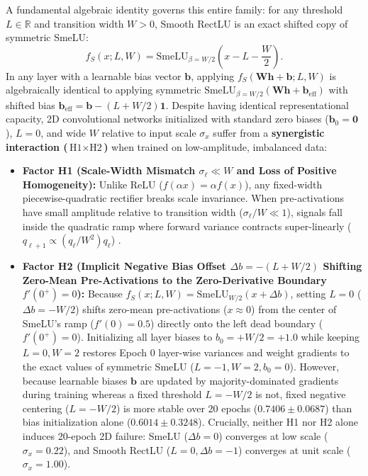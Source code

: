 \documentclass[11pt, a4paper]{article}
\begin{document}
A fundamental algebraic identity governs this entire family: for any threshold $L \in \mathbb{R}$ and transition width $W > 0$, Smooth RectLU is an exact shifted copy of symmetric SmeLU:
\begin{equation}
f_{S}(x; L, W) = \text{SmeLU}_{\beta = W/2}\!\left(x - L - \frac{W}{2}\right).
\end{equation}
In any layer with a learnable bias vector $\mathbf{b}$, applying $f_{S}(\mathbf{W}\mathbf{h} + \mathbf{b}; L, W)$ is algebraically identical to applying symmetric $\text{SmeLU}_{\beta=W/2}(\mathbf{W}\mathbf{h} + \mathbf{b}_{\text{eff}})$ with shifted bias $\mathbf{b}_{\text{eff}} = \mathbf{b} - (L + W/2)\mathbf{1}$. Despite having identical representational capacity, 2D convolutional networks initialized with standard zero biases ($\mathbf{b}_{0} = \mathbf{0}$), $L = 0$, and wide $W$ relative to input scale $\sigma_{x}$ suffer from a \textbf{synergistic interaction ($\text{H1} \times \text{H2}$)} when trained on low-amplitude, imbalanced data:
\begin{itemize}
    \item \textbf{Factor H1 (Scale-Width Mismatch $\sigma_{\ell} \ll W$ and Loss of Positive Homogeneity):} Unlike ReLU ($f(\alpha x) = \alpha f(x)$), any fixed-width piecewise-quadratic rectifier breaks scale invariance. When pre-activations have small amplitude relative to transition width ($\sigma_{\ell}/W \ll 1$), signals fall inside the quadratic ramp where forward variance contracts super-linearly ($q_{\ell+1} \propto (q_{\ell}/W^{2})q_{\ell}$) \cite{ref18, ref19, ref20}.
    \item \textbf{Factor H2 (Implicit Negative Bias Offset $\Delta b = -(L + W/2)$ Shifting Zero-Mean Pre-Activations to the Zero-Derivative Boundary $f'(0^{+}) = 0$):} Because $f_{S}(x; L, W) = \text{SmeLU}_{W/2}(x + \Delta b)$, setting $L = 0$ ($\Delta b = -W/2$) shifts zero-mean pre-activations ($x \approx 0$) from the center of SmeLU's ramp ($f'(0) = 0.5$) directly onto the left dead boundary ($f'(0^{+}) = 0$). Initializing all layer biases to $b_{0} = +W/2 = +1.0$ while keeping $L = 0, W = 2$ restores Epoch 0 layer-wise variances and weight gradients to the exact values of symmetric SmeLU ($L = -1, W = 2, b_{0} = 0$). However, because learnable biases $\mathbf{b}$ are updated by majority-dominated gradients during training whereas a fixed threshold $L = -W/2$ is not, fixed negative centering ($L = -W/2$) is more stable over 20 epochs ($0.7406 \pm 0.0687$) than bias initialization alone ($0.6014 \pm 0.3248$). Crucially, neither H1 nor H2 alone induces 20-epoch 2D failure: SmeLU ($\Delta b = 0$) converges at low scale ($\sigma_{x} = 0.22$), and Smooth RectLU ($L = 0, \Delta b = -1$) converges at unit scale ($\sigma_{x} = 1.00$).
\end{itemize}
\end{document}
